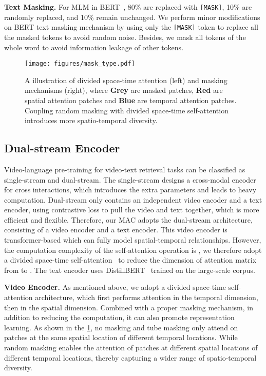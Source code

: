 \documentclass[10pt,twocolumn,letterpaper]{article}
\begin{document}
\vspace{1mm}\noindent\textbf{Text Masking.} For MLM in BERT~\cite{bert}, 80\% are replaced with \verb+[MASK]+, 10\% are randomly replaced, and 10\% remain unchanged. We perform minor modifications on BERT text masking mechanism by using only the \verb+[MASK]+ token to replace all the masked tokens to avoid random noise. Besides, we mask all tokens of the whole word to avoid information leakage of other tokens. 

\begin{figure}[t]
  \centering
  \texttt{[image: figures/mask\_type.pdf]}
   \caption{A illustration of divided space-time attention (left) and masking mechanisms (right), where \textbf{Grey} are masked patches, \textbf{Red} are spatial attention patches and \textbf{Blue} are temporal attention patches. Coupling random masking with divided space-time self-attention introduces more spatio-temporal diversity.}\vspace{-2mm}
   \label{fig:masking-type}
\end{figure}

\vspace{-1mm}\subsection{Dual-stream Encoder}\vspace{-1mm}
\label{sec:dual-stream encoder}
Video-language pre-training for video-text retrieval tasks can be classified as single-stream and dual-stream. The single-stream designs a cross-modal encoder for  cross interactions, which introduces the extra parameters and leads to heavy computation. Dual-stream only contains an independent video encoder and a text encoder, using contrastive loss to pull the video and text together, which is more efficient and flexible. Therefore, our MAC adopts the dual-stream architecture, consisting of a video encoder and a text encoder. This video encoder is transformer-based which can fully model spatial-temporal relationships. However, the computation complexity of the self-attention operation is , we therefore adopt a divided space-time self-attention~\cite{vivit, timesformer} to reduce the dimension of attention matrix from  to . The text encoder uses DistillBERT~\cite{distilbert} trained on the large-scale corpus. 

\vspace{1mm}\noindent\textbf{Video Encoder.} As mentioned above, we adopt a divided space-time self-attention architecture, which first performs attention in the temporal dimension, then in the spatial dimension. Combined with a proper masking mechanism, in addition to reducing the computation, it can also promote representation learning. As shown in the \cref{fig:masking-type}, no masking and tube masking only attend on patches at the same spatial location of different temporal locations. While random masking enables the attention of patches at different spatial locations of different temporal locations, thereby capturing a wider range of spatio-temporal diversity. 
\end{document}
